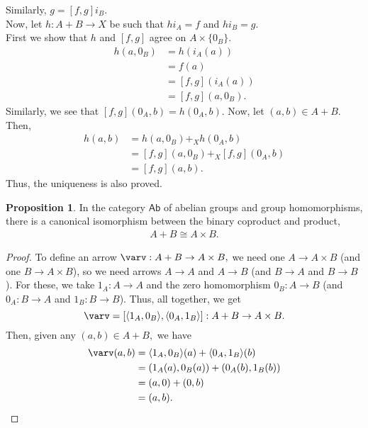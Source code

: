 \documentclass[11pt,leqno,landscape,semhelv]{seminar}
\theoremstyle{definition}
\newtheorem{prop}[thm]{Proposition}
\numberwithin{joke}{section}
\numberwithin{thm}{section}
\numberwithin{equation}{section}
\begin{document}
Similarly, $g = [f, g]i_B.$\\
Now, let $h:A + B \to X$ be such that $hi_A = f$ and $hi_B = g.$\\
First we show that $h$ and $[f, g]$ agree on $A \times \{0_B\}.$
\begin{align*} 
  h(a, 0_B) &= h(i_A(a))\\
  &= f(a)\\
  &= [f, g](i_A(a))\\
  &= [f, g](a, 0_B).
\end{align*}
Similarly, we see that $[f, g](0_A, b) = h(0_A, b).$
Now, let $(a, b) \in A + B.$ Then,
\begin{align*} 
  h(a, b) &= h(a, 0_B) +_X h(0_A, b)\\
  &= [f, g](a, 0_B) +_X [f, g](0_A, b)\\
  &= [f, g](a, b).
\end{align*}
Thus, the uniqueness is also proved.

\begin{prop}
  In the category $\mathsf{Ab}$ of abelian groups and group homomorphisms, there is a canonical isomorphism between the binary coproduct and product,
  \begin{align*} 
    A + B \cong A \times B.
  \end{align*}
\end{prop}
\begin{proof}
  To define an arrow $\varv:A+B \to A\times B,$ we need one $A \to A \times B$ (and one $B \to A \times B$), so we need arrows $A\to A$ and $A \to B$ (and $B \to A$ and $B \to B$). For these, we take $1_A : A \to A$ and the zero homomorphism $0_B : A \to B$ (and $0_A : B \to A$ and $1_B : B \to B$). Thus, all together, we get
  \begin{equation*} 
    \varv = [\langle 1_A, 0_B\rangle, \langle 0_A, 1_B\rangle]:A+B \to A \times B.
  \end{equation*}
  Then, given any $(a, b) \in A + B,$ we have
  \begin{align*} 
    \varv(a, b) &= \langle 1_A, 0_B\rangle(a) + \langle 0_A, 1_B\rangle(b)\\
    &= (1_A(a), 0_B(a)) + (0_A(b), 1_B(b))\\
    &= (a, 0) + (0, b)\\
    &= (a, b).
  \end{align*}
\end{proof}
\end{document}
